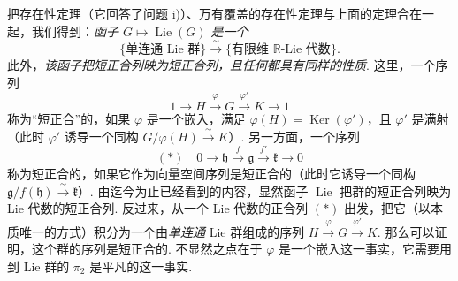 \begin{remark*}
把存在性定理（它回答了问题 i)）、万有覆盖的存在性定理与上面的定理合在一起，我们得到：\emph{函子 $G\mapsto\operatorname{Lie}(G)$ 是一个}
\[
\{\text{单连通 Lie 群}\}\xrightarrow{\ \sim\ }\{\text{有限维 $\mathbb R$-Lie 代数}\}.
\]
此外，\emph{该函子把短正合列映为短正合列，且任何都具有同样的性质}. 这里，一个序列
\[
1\longrightarrow H\xrightarrow{\ \varphi\ }G\xrightarrow{\ \varphi'\ }K\longrightarrow 1
\]
称为``短正合''的，如果 $\varphi$ 是一个嵌入，满足 $\varphi(H)=\operatorname{Ker}(\varphi')$，且 $\varphi'$ 是满射（此时 $\varphi'$ 诱导一个同构 $G/\varphi(H)\xrightarrow{\ \sim\ }K$）. 另一方面，一个序列
\[
(*)\quad 0\longrightarrow\mathfrak h\xrightarrow{\ f\ }\mathfrak g\xrightarrow{\ f'\ }\mathfrak k\longrightarrow 0
\]
称为短正合的，如果它作为向量空间序列是短正合的（此时它诱导一个同构 $\mathfrak g/f(\mathfrak h)\xrightarrow{\ \sim\ }\mathfrak k$）. 由迄今为止已经看到的内容，显然函子 $\operatorname{Lie}$ 把群的短正合列映为 Lie 代数的短正合列. 反过来，从一个 Lie 代数的正合列 $(*)$ 出发，把它（以本质唯一的方式）积分为一个由\emph{单连通} Lie 群组成的序列 $H\xrightarrow{\ \varphi\ }G\xrightarrow{\ \varphi'\ }K$. 那么可以证明，这个群的序列是短正合的. 不显然之点在于 $\varphi$ 是一个嵌入这一事实，它需要用到 Lie 群的 $\pi_{2}$ 是平凡的这一事实.
\end{remark*}
